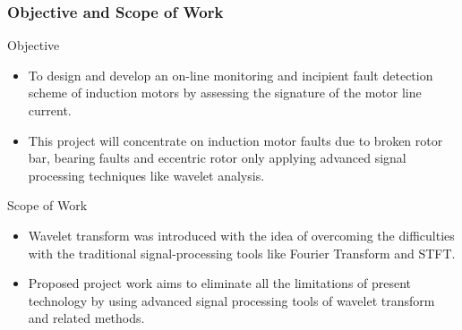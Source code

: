 \documentclass[9pt]{beamer}
\begin{document}
\begin{frame}
\frametitle{Objective and Scope of Work}

\begin{block}{Objective}
    \begin{itemize}
    \item To design and develop an on-line monitoring and incipient fault detection scheme of induction motors by assessing the signature of the motor line current.
    \item This  project  will concentrate on induction motor faults due to broken rotor bar, bearing faults and eccentric rotor only applying  advanced  signal processing techniques like wavelet analysis.
    \end{itemize}
\end{block}

\begin{block}{Scope of Work}
    \begin{itemize}
    \item Wavelet transform was introduced with the idea of overcoming the difficulties with the traditional signal-processing tools like Fourier Transform and STFT.
    \item Proposed project work aims to eliminate all the limitations of present technology by using advanced signal processing tools of wavelet transform and related methods.
    \end{itemize}
\end{block}
\end{frame}
\end{document}
